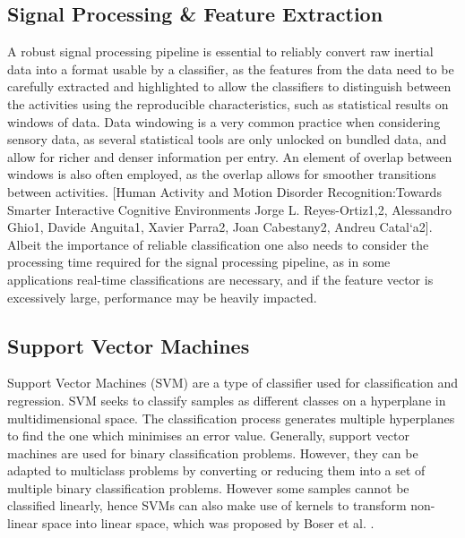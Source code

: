 \subsection{Signal Processing \& Feature Extraction}
A robust signal processing pipeline is essential to reliably convert raw inertial data into a format usable by a classifier, as the features from the data need to be carefully extracted and highlighted to allow the classifiers to distinguish between the activities using the reproducible characteristics, such as statistical results on windows of data. 
Data windowing is a very common practice when considering sensory data, as several statistical tools are only unlocked on bundled data, and allow for richer and denser information per entry. An element of overlap between windows is also often employed, as the overlap allows for smoother transitions between activities. [Human Activity and Motion Disorder Recognition:Towards Smarter Interactive Cognitive Environments Jorge L. Reyes-Ortiz1,2, Alessandro Ghio1, Davide Anguita1, Xavier Parra2, Joan Cabestany2, Andreu Catal`a2].
Albeit the importance of reliable classification one also needs to consider the processing time required for the signal processing pipeline, as in some applications real-time classifications are necessary, and if the feature vector is excessively large, performance may be heavily impacted. 



\subsection{Support Vector Machines}
    Support Vector Machines (SVM) are a type of classifier used for classification and regression. SVM seeks to classify samples as different classes
    on a hyperplane in multidimensional space. The classification process generates multiple hyperplanes to find the one which minimises an error value.
    Generally, support vector machines are used for binary classification problems. However, they can be adapted to multiclass problems by converting
    or reducing them into a set of multiple binary classification problems. However some samples cannot be classified linearly, hence SVMs can also make
    use of kernels to transform non-linear space into linear space, which was proposed by Boser et al. \cite{Boser1992}.


